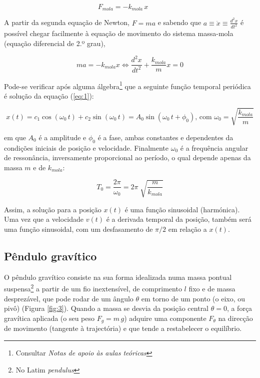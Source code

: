 \documentclass[a4paper,twoside,12pt]{article}      %
\begin{document}
\begin{equation}
F_{mola} = - k_{mola} \, x \qquad 
\end{equation}

A partir da segunda equação de Newton, $F=m a$ e sabendo que $ a \equiv  \ddot{x} \equiv  \frac{d^2 x}{dt^2}$ é possível chegar facilmente  à equação de movimento do sistema massa-mola (equação diferencial de 2.º grau),

\begin{equation}
	\label{eq:1} 
 m a = - k_{mola} x \Leftrightarrow \frac{d^2 x}{dt^2}  + \frac{k_{mola}}{m} x = 0
\end{equation}

Pode-se verificar após alguma álgebra\footnote{Consultar \emph{Notas de apoio às aulas teóricas}} que a seguinte função temporal periódica é solução da equação (\ref{eq:1}):

\begin{equation}
	\label{eq:solu_mola}
x(t) = c_1 \cos(\omega_0 \, t) + c_2 \sin(\omega_0 \, t) = A_0 \sin(\omega_0 \, t + \phi_0) \text{, com } \omega_0 = \sqrt{\frac{k_{mola}}{m}}
\end{equation}

em que $ A_0 $ é a amplitude e $\phi_0$ é a fase, ambas constantes e dependentes da condições iniciais de posição e velocidade. 
Finalmente $\omega_0$ é a frequência angular de ressonância, inversamente proporcional ao período, o qual depende apenas da massa $m$ e de $k_{mola}$:

\begin{equation}
	\label{eq:period_mola}
T_0 = \frac{2 \pi}{\omega_0} = 2\pi\; \sqrt{\frac{m}{k_{mola}}}
\end{equation}

Assim, a solução para a posição $x(t)$ é uma função sinusoidal (harmónica). Uma vez que a velocidade $v(t)$ é a derivada temporal da posição, também será uma função sinusoidal, com um desfasamento de $\pi/2$ em relação a $x(t)$.



\subsection{\sf Pêndulo gravítico}
O pêndulo gravítico consiste na sua forma idealizada numa massa pontual suspensa\footnote{No Latim \emph{pendulus}} a partir de um fio inextensível, de comprimento $l$ fixo e de massa desprezável, que pode rodar de um ângulo $\theta$ em torno de um ponto (o eixo, ou pivô) (Figura \ref{fig:3}). Quando a massa se desvia da posição central $\theta=0$, a força gravítica aplicada (o seu peso $F_g = m \, g $) adquire uma componente $F_{\theta}$ na direcção de movimento (tangente à trajectória) e que tende a restabelecer o equilíbrio.
\end{document}
